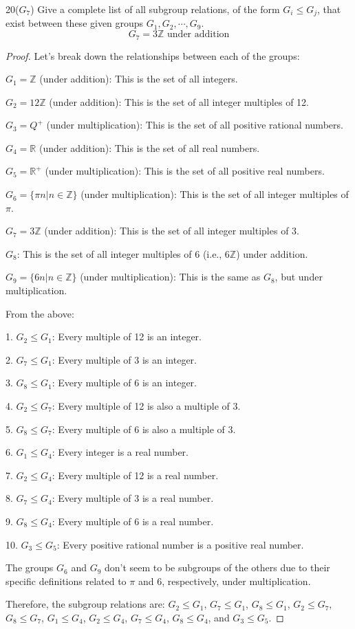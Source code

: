 \documentclass[12pt]{amsart}
\theoremstyle{definition}
\numberwithin{equation}{section}
\theoremstyle{plain}
\newcommand{\Z}{\mathbb{Z}}
\newcommand{\R}{\mathbb{R}}
\begin{document}
    \begin{exercise}{20($G_7$)}
        Give a complete list of all subgroup relations, of the form $G_i \leq G_j$, that exist between these given groups $G_1, G_2, \cdots, G_9$.
\[G_7 = 3\Z \text{ under addition}\]
            
    \begin{proof}
Let's break down the relationships between each of the groups:

\(G_1 = \Z\) (under addition): This is the set of all integers.

\(G_2 = 12\Z\) (under addition): This is the set of all integer multiples of 12.

\(G_3 = Q^+\) (under multiplication): This is the set of all positive rational numbers.

\(G_4 = \R\) (under addition): This is the set of all real numbers.

\(G_5 = \R^+\) (under multiplication): This is the set of all positive real numbers.

\(G_6 = \{\pi n | n \in \Z\}\) (under multiplication): This is the set of all integer multiples of $\pi$.

\(G_7 = 3\Z\) (under addition): This is the set of all integer multiples of 3.

\(G_8\): This is the set of all integer multiples of 6 (i.e., $6\Z$) under addition.

\(G_9 = \{6n | n \in \Z\}\) (under multiplication): This is the same as \(G_8\), but under multiplication.

From the above:

1. \(G_2 \leq G_1\): Every multiple of 12 is an integer.

2. \(G_7 \leq G_1\): Every multiple of 3 is an integer.

3. \(G_8 \leq G_1\): Every multiple of 6 is an integer.

4. \(G_2 \leq G_7\): Every multiple of 12 is also a multiple of 3.

5. \(G_8 \leq G_7\): Every multiple of 6 is also a multiple of 3.

6. \(G_1 \leq G_4\): Every integer is a real number.

7. \(G_2 \leq G_4\): Every multiple of 12 is a real number.

8. \(G_7 \leq G_4\): Every multiple of 3 is a real number.

9. \(G_8 \leq G_4\): Every multiple of 6 is a real number.

10. \(G_3 \leq G_5\): Every positive rational number is a positive real number.

The groups \(G_6\) and \(G_9\) don't seem to be subgroups of the others due to their specific definitions related to $\pi$ and 6, respectively, under multiplication. 

Therefore, the subgroup relations are: \(G_2 \leq G_1\), \(G_7 \leq G_1\), \(G_8 \leq G_1\), \(G_2 \leq G_7\), \(G_8 \leq G_7\), \(G_1 \leq G_4\), \(G_2 \leq G_4\), \(G_7 \leq G_4\), \(G_8 \leq G_4\), and \(G_3 \leq G_5\).
    \end{proof}
    \end{exercise}
                
\end{document}
